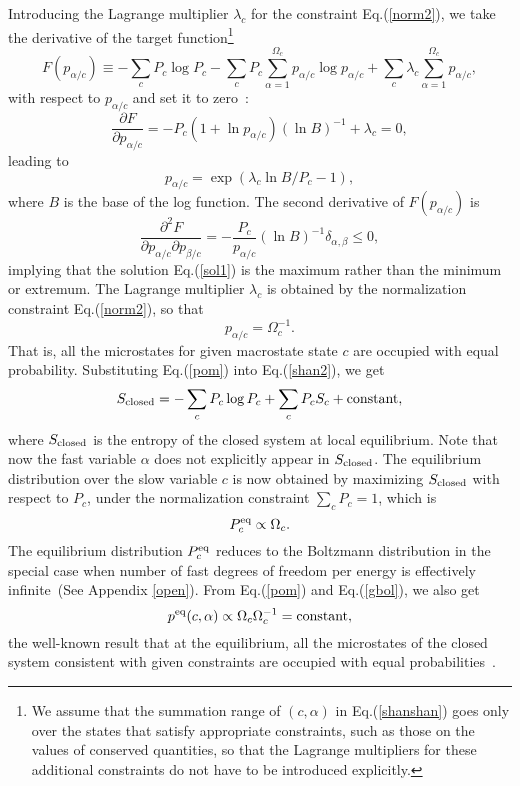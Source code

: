 \documentclass[aps,pre,amsmath,amssymb,floatfix,preprint,nofootinbib]{revtex4}
\begin{document}
Introducing the Lagrange multiplier $\lambda_c$ for the constraint Eq.(\ref{norm2}), we take the derivative of the target function\footnote{We assume that the summation range of $(c,\alpha)$ in Eq.(\ref{shanshan}) goes only over the states that satisfy appropriate constraints, such as those on the values of conserved quantities, so that the Lagrange multipliers for these additional constraints do not have to be introduced explicitly.}
\begin{equation}
F(p_{\alpha/c}) \equiv - \sum_{c} P_c \log P_c - \sum_c P_c \sum_{\alpha=1}^{\Omega_c } p_{\alpha/c} \log p_{\alpha/c} + \sum_c \lambda_c \sum_{\alpha=1}^{\Omega_c} p_{\alpha/c},
\end{equation}
with respect to $p_{\alpha/c}$ and set it to zero~\cite{lee}:
\begin{equation}
\frac{\partial F}{\partial p_{\alpha/c}}= -  P_c (1 + \ln p_{\alpha/c})(\ln B)^{-1} +  \lambda_c = 0,
\end{equation}
leading to
\begin{equation}
 p_{\alpha/c} =  \exp(\lambda_c \ln B /P_c -1),\label{sol1}
\end{equation}
where $B$ is the base of the log function.
The second derivative of $F(p_{\alpha/c})$ is
\begin{equation}
\frac{\partial^2 F}{\partial p_{\alpha/c} \partial p_{\beta/c}}= -\frac{P_c}{p_{\alpha/c}} (\ln B)^{-1} \delta_{\alpha,\beta} \le 0,
\end{equation}
implying that the solution Eq.(\ref{sol1}) is the maximum rather than the minimum or extremum. The Lagrange multiplier $\lambda_c$ is obtained by the normalization constraint Eq.(\ref{norm2}), so that
\begin{equation}
p_{\alpha/c} = \Omega_c^{-1}. \label{pom}
\end{equation}
That is, all the microstates for given macrostate state $c$ are occupied with equal probability. Substituting Eq.(\ref{pom}) into Eq.(\ref{shan2}), we get~\cite{lee}
\begin{equation}
S_{\rm closed} = - \sum_{c} P_c \log P_c + \sum_c P_c S_c + {\rm constant}, \label{closd}
\end{equation}
where $S_{\rm closed}$ is the entropy of the closed system at local equilibrium. Note that now the fast variable $\alpha$ does not explicitly appear in $S_{\rm closed}$. The equilibrium distribution over the slow variable $c$ is now obtained by maximizing $S_{\rm closed}$ with respect to $P_c$, under the normalization constraint $\sum_c P_c = 1$, which is
\begin{equation}
P^{\rm eq}_c \propto \Omega_c. \label{gbol}
\end{equation}
The equilibrium distribution $P^{\rm eq}_c$ reduces to the Boltzmann distribution in the special case when number of fast degrees of freedom per energy is effectively infinite~(See Appendix \ref{open}). 
 From Eq.(\ref{pom}) and Eq.(\ref{gbol}), we also get
 \begin{equation}
p^{\rm eq}(c, \alpha) \propto \Omega_c \Omega_c^{-1} = {\rm constant}, 
\end{equation}
the well-known result that at the equilibrium, all the microstates of the closed system consistent with given constraints are occupied with equal probabilities~\cite{lee,tolman}. 
\end{document}

